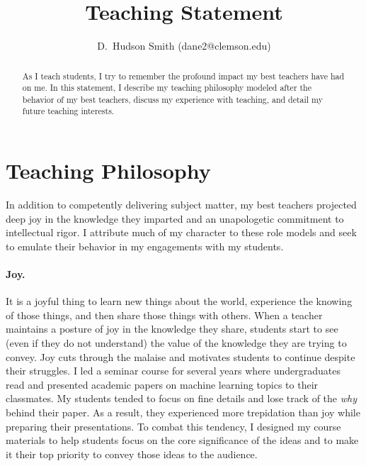 \documentclass[nobib]{tufte-handout}
\title{Teaching Statement}
\author{D.~Hudson Smith (dane2@clemson.edu)}
\begin{document}
\maketitle%

\begin{abstract}
  \noindent As I teach students, I try to remember the profound impact my best teachers have had on me. In this statement, I describe my teaching philosophy modeled after the behavior of my best teachers, discuss my experience with teaching, and detail my future teaching interests.
\end{abstract}

{}


\section{Teaching Philosophy}
In addition to competently delivering subject matter, my best teachers projected deep joy in the knowledge they imparted and an unapologetic commitment to intellectual rigor. I attribute much of my character to these role models and seek to emulate their behavior in my engagements with my students.

\paragraph{Joy.} It is a joyful thing to learn new things about the world, experience the knowing of those things, and then share those things with others. When a teacher maintains a posture of joy in the knowledge they share, students start to see (even if they do not understand) the value of the knowledge they are trying to convey. Joy cuts through the malaise and motivates students to continue despite their struggles. I led a seminar course for several years where undergraduates read and presented academic papers on machine learning topics to their classmates. My students tended to focus on fine details and lose track of the {\it why} behind their paper. As a result, they experienced more trepidation than joy while preparing their presentations. To combat this tendency, I designed my course materials to help students focus on the core significance of the ideas and to make it their top priority to convey those ideas to the audience.
\end{document}
